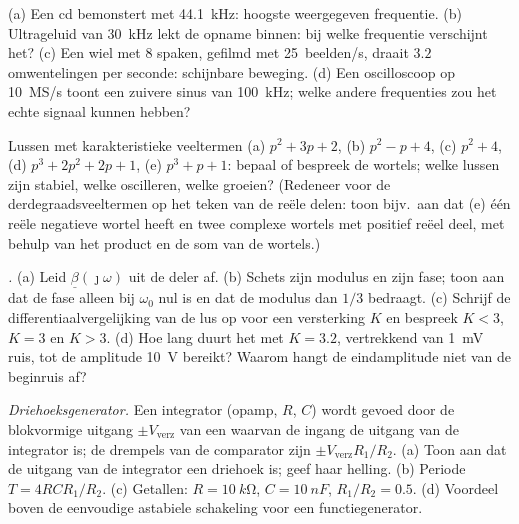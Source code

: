 \begin{exercise}[$\star$]\label{exo:b2:feedback-oscillators:4}
(a) Een cd bemonstert met \qty{44.1}{kHz}: hoogste weergegeven frequentie.
(b) Ultrageluid van \qty{30}{kHz} lekt de opname binnen: bij welke
frequentie verschijnt het? (c) Een wiel met $8$ spaken, gefilmd met
\qty{25}{beelden/s}, draait $3.2$ omwentelingen per seconde: schijnbare
beweging. (d) Een oscilloscoop op \qty{10}{MS/s} toont een zuivere sinus van
\qty{100}{kHz}; welke andere frequenties zou het echte signaal kunnen
hebben?
\end{exercise}

\begin{exercise}[$\star\star$]\label{exo:b2:feedback-oscillators:5}
Lussen met karakteristieke veeltermen (a) $p^2 + 3p + 2$, (b) $p^2 - p +
4$,
(c) $p^2 + 4$, (d) $p^3 + 2p^2 + 2p + 1$, (e) $p^3 + p + 1$: bepaal of
bespreek de wortels; welke lussen zijn stabiel, welke oscilleren, welke
groeien? (Redeneer voor de derdegraadsveeltermen op het teken van de reële
delen: toon bijv.\ aan dat (e) één reële negatieve wortel heeft en twee
complexe wortels met positief reëel deel, met behulp van het product en de
som van de wortels.)
\end{exercise}

\begin{exercise}[$\star\star$]\label{exo:b2:feedback-oscillators:6}
\emph{.} (a) Leid $\underline\beta(\jmath\omega)$ uit de deler
af. (b) Schets zijn modulus en zijn fase; toon aan dat de fase alleen bij
$\omega_0$ nul is en dat de modulus dan $1/3$ bedraagt. (c) Schrijf de
differentiaalvergelijking van de lus op voor een versterking $K$ en bespreek
$K < 3$, $K = 3$ en $K > 3$. (d) Hoe lang duurt het met $K = 3.2$,
vertrekkend van \qty{1}{mV} ruis, tot de amplitude \qty{10}{V} bereikt?
Waarom hangt de eindamplitude niet van de beginruis af?
\end{exercise}

\begin{exercise}[$\star\star$]\label{exo:b2:feedback-oscillators:7}
\emph{Driehoeksgenerator.} Een integrator (opamp, $R$, $C$) wordt gevoed
door de blokvormige uitgang $\pm V_{\text{verz}}$ van een 
waarvan de ingang de uitgang van de integrator is; de drempels van de
comparator zijn $\pm V_{\text{verz}}R_1/R_2$. (a) Toon aan dat de uitgang van
de integrator een driehoek is; geef haar helling. (b) Periode
$T = 4RCR_1/R_2$. (c) Getallen: $R = \qty{10}{k\ohm}$, $C = \qty{10}{nF}$,
$R_1/R_2 = 0.5$. (d) Voordeel boven de eenvoudige astabiele schakeling voor
een functiegenerator.
\end{exercise}

